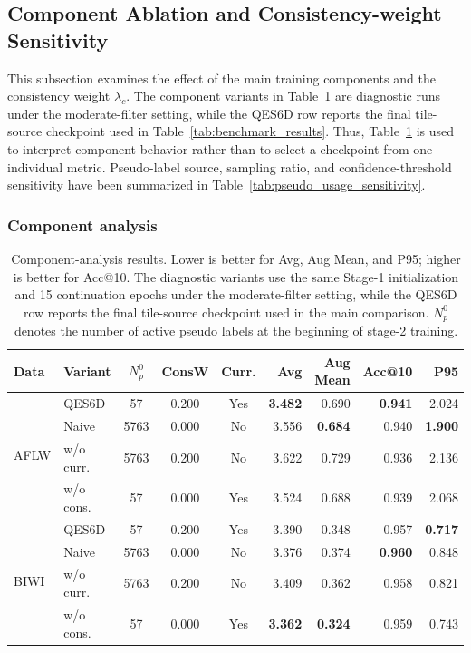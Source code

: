 \documentclass[preprint,12pt]{elsarticle}
\begin{document}
\subsection{Component Ablation and Consistency-weight Sensitivity}
\label{subsec:ablation_sensitivity}

This subsection examines the effect of the main training components and the consistency weight $\lambda_c$. The component variants in Table~\ref{tab:component_analysis} are diagnostic runs under the moderate-filter setting, while the QES6D row reports the final tile-source checkpoint used in Table~\ref{tab:benchmark_results}. Thus, Table~\ref{tab:component_analysis} is used to interpret component behavior rather than to select a checkpoint from one individual metric. Pseudo-label source, sampling ratio, and confidence-threshold sensitivity have been summarized in Table~\ref{tab:pseudo_usage_sensitivity}.

\subsubsection{Component analysis}

\begin{table}[t]
\centering
\caption{Component-analysis results. Lower is better for Avg, Aug Mean, and P95; higher is better for Acc@10. The diagnostic variants use the same Stage-1 initialization and 15 continuation epochs under the moderate-filter setting, while the QES6D row reports the final tile-source checkpoint used in the main comparison. $N_p^0$ denotes the number of active pseudo labels at the beginning of stage-2 training.}
\label{tab:component_analysis}
\small
\setlength{\tabcolsep}{5pt}
\renewcommand{\arraystretch}{1.08}
\begin{tabular}{llcccrrrr}
\toprule
Data & Variant & $N_p^0$ & ConsW & Curr. & Avg & Aug Mean & Acc@10 & P95 \\
\midrule
\multirow{4}{*}{AFLW}
& QES6D & 57 & 0.200 & Yes & \textbf{3.482} & 0.690 & \textbf{0.941} & 2.024 \\
& Naive & 5763 & 0.000 & No & 3.556 & \textbf{0.684} & 0.940 & \textbf{1.900} \\
& w/o curr. & 5763 & 0.200 & No & 3.622 & 0.729 & 0.936 & 2.136 \\
& w/o cons. & 57 & 0.000 & Yes & 3.524 & 0.688 & 0.939 & 2.068 \\
\midrule
\multirow{4}{*}{BIWI}
& QES6D & 57 & 0.200 & Yes & 3.390 & 0.348 & 0.957 & \textbf{0.717} \\
& Naive & 5763 & 0.000 & No & 3.376 & 0.374 & \textbf{0.960} & 0.848 \\
& w/o curr. & 5763 & 0.200 & No & 3.409 & 0.362 & 0.958 & 0.821 \\
& w/o cons. & 57 & 0.000 & Yes & \textbf{3.362} & \textbf{0.324} & 0.959 & 0.743 \\
\bottomrule
\end{tabular}
\end{table}
\end{document}

